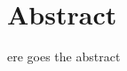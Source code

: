 %

\chapter*{Abstract}
\begin{SingleSpace}
ere goes the abstract \lipsum[2]
\end{SingleSpace}
\clearpage